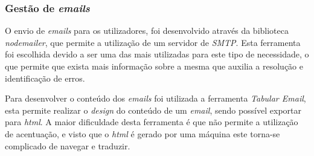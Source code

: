 \subsubsection{Gestão de \textit{emails}}
O envio de \textit{emails} para os utilizadores, foi desenvolvido através da biblioteca \textit{nodemailer}, que permite a utilização de um servidor de \textit{SMTP}. Esta ferramenta foi escolhida devido a ser uma das mais utilizadas para este tipo de necessidade, o que permite que exista mais informação sobre a mesma que auxilia a resolução e identificação de erros. 

Para desenvolver o conteúdo dos \textit{emails} foi utilizada a ferramenta \textit{Tabular Email}, esta permite realizar o \textit{design} do conteúdo de um \textit{email}, sendo possível exportar para \textit{html}. A maior dificuldade desta ferramenta é que não permite a utilização de acentuação, e visto que o \textit{html} é gerado por uma máquina este torna-se complicado de navegar e traduzir.